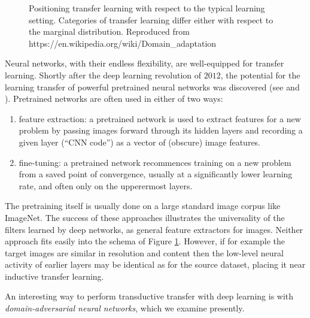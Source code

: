 \begin{figure}
\caption{Positioning transfer learning with respect to the typical learning setting. Categories of transfer learning differ either with respect to the marginal distribution. Reproduced from https://en.wikipedia.org/wiki/Domain\_adaptation}
\label{fig:transfer_modes}
\end{figure}

Neural networks, with their endless flexibility, are well-equipped for transfer learning. Shortly after the deep learning revolution of $2012$, the potential for the learning transfer of powerful pretrained neural networks was discovered (see \cite{zeiler2014visualizing} and \cite{sharif2014cnn}). Pretrained networks are often used in either of two ways:

\begin{enumerate}
\item feature extraction: a pretrained network is used to extract features for a new problem by passing images forward through its hidden layers and recording a given layer (``CNN code'') as a vector of (obscure) image features.
\item fine-tuning: a pretrained network recommences training on a new problem from a saved point of convergence, usually at a significantly lower learning rate, and often only on the upperermost layers.
\end{enumerate}

The pretraining itself is usually done on a large standard image corpus like ImageNet. The success of these approaches illustrates the universality of the filters learned by deep networks, as general feature extractors for images. Neither approach fits easily into the schema of Figure \ref{fig:transfer_modes}. However, if for example the target images are similar in resolution and content then the low-level neural activity of earlier layers may be identical as for the source dataset, placing it near inductive transfer learning.

An interesting way to perform transductive transfer with deep learning is with \emph{domain-adversarial neural networks}, which we examine presently.

